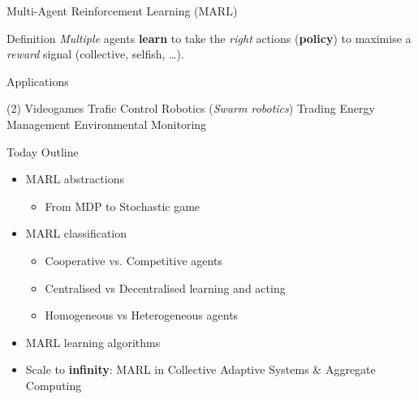 \documentclass[presentation, 8pt]{beamer}\mode<presentation>{\usetheme{AMSBolognaFC}}
\begin{document}
\begin{frame}[c]{Multi-Agent Reinforcement Learning (MARL)}

\begin{exampleblock}{Definition}
	\emph{Multiple} agents \textbf{learn} to take the \emph{right} actions (\textbf{policy}) to maximise a \emph{reward} signal (collective, selfish, \dots).
\end{exampleblock}

\begin{alertblock}{Applications}
	\begin{tasks}(2)
		\task Videogames
		\task Trafic Control
		\task Robotics (\emph{Swarm robotics})
		\task Trading
		\task Energy Management
		\task Environmental Monitoring
	\end{tasks}
\end{alertblock}
\begin{exampleblock}{Today Outline}
	\begin{itemize}
		\item MARL abstractions
		\begin{itemize}
			\item[\faArrowRight] From MDP to Stochastic game
		\end{itemize}
		\item MARL classification
		\begin{itemize}
			\item[\faArrowRight] Cooperative vs. Competitive agents
			\item[\faArrowRight] Centralised vs Decentralised learning and acting
			\item[\faArrowRight] Homogeneous vs Heterogeneous agents
		\end{itemize}
		\item MARL learning algorithms 
		\item Scale to \textbf{infinity}: MARL in Collective Adaptive Systems \& Aggregate Computing
	\end{itemize}
\end{exampleblock}
\end{frame}
\end{document}
